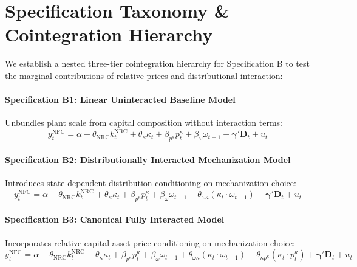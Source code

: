 \documentclass[11pt,a4paper]{article}
\begin{document}
\FloatBarrier
\section{Specification Taxonomy \& Cointegration Hierarchy}

We establish a nested three-tier cointegration hierarchy for Specification B to test the marginal contributions of relative prices and distributional interaction:

\paragraph{Specification B1: Linear Uninteracted Baseline Model}
Unbundles plant scale from capital composition without interaction terms:
\begin{equation}
y_t^{\text{NFC}} = \alpha + \theta_{\text{NRC}} k_t^{\text{NRC}} + \theta_{\kappa} \kappa_t + \beta_{p^{\kappa}} p_t^{\kappa} + \beta_{\omega} \omega_{t-1} + \boldsymbol{\gamma}' \mathbf{D}_t + u_t
\end{equation}

\paragraph{Specification B2: Distributionally Interacted Mechanization Model}
Introduces state-dependent distribution conditioning on mechanization choice:
\begin{equation}
y_t^{\text{NFC}} = \alpha + \theta_{\text{NRC}} k_t^{\text{NRC}} + \theta_{\kappa} \kappa_t + \beta_{p^{\kappa}} p_t^{\kappa} + \beta_{\omega} \omega_{t-1} + \theta_{\omega \kappa} (\kappa_t \cdot \omega_{t-1}) + \boldsymbol{\gamma}' \mathbf{D}_t + u_t
\end{equation}

\paragraph{Specification B3: Canonical Fully Interacted Model}
Incorporates relative capital asset price conditioning on mechanization choice:
\begin{equation}
y_t^{\text{NFC}} = \alpha + \theta_{\text{NRC}} k_t^{\text{NRC}} + \theta_{\kappa} \kappa_t + \beta_{p^{\kappa}} p_t^{\kappa} + \beta_{\omega} \omega_{t-1} + \theta_{\omega \kappa} (\kappa_t \cdot \omega_{t-1}) + \theta_{\kappa p^{\kappa}} (\kappa_t \cdot p_t^{\kappa}) + \boldsymbol{\gamma}' \mathbf{D}_t + u_t
\end{equation}
\end{document}

